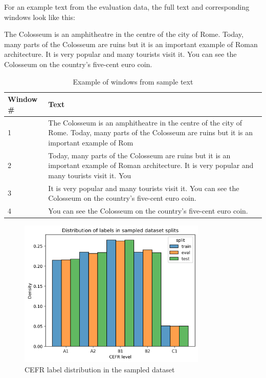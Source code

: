 \documentclass[11pt,a4paper]{article}
\begin{document}
\begin{table}
  \centering
  \begin{adjustwidth}{1cm}{1cm}
  For an example text from the evaluation data, the full text and corresponding
  windows look like this:

  \begin{displayquote}
    The Colosseum is an amphitheatre in the centre of the city of Rome. Today,
    many parts of the Colosseum are ruins but it is an important example of Roman
    architecture. It is very popular and many tourists visit it. You can see the
    Colosseum on the country’s five-cent euro coin.
  \end{displayquote}
  \end{adjustwidth}

  \begin{tabular}{l|p{}}
    \toprule
    Window \# & Text\\
    \midrule
    1 & The Colosseum is an amphitheatre in the centre of the city of Rome.
    Today, many parts of the Colosseum are ruins but it is an important
    example of Rom\\
    \midrule
    2 & Today, many parts of the Colosseum are ruins but it is an important
    example of Roman architecture. It is very popular and many tourists visit
    it. You\\
    \midrule
    3 & It is very popular and many tourists visit it. You can see the
    Colosseum on the country’s five-cent euro coin.\\
    \midrule
    4 & You can see the Colosseum on the country’s five-cent euro coin.\\
    \bottomrule
  \end{tabular}
  \caption{Example of windows from sample text}
  \label{tab:windowing-example}
\end{table}

\begin{figure}
  \centering
  \includegraphics[width=0.8\textwidth]{figures/split-distributions-thinned.png}
  \caption{CEFR label distribution in the sampled dataset}
  \label{fig:cefr-distribution-sampled}
\end{figure}
\end{document}
